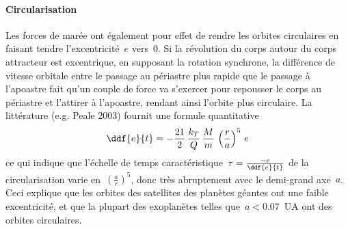 \sk
\paragraph{Circularisation} Les forces de marée ont également pour effet de rendre les orbites circulaires en faisant tendre l'excentricité~$e$ vers~$0$. Si la révolution du corps autour du corps attracteur est excentrique, en supposant la rotation synchrone, la différence de vitesse orbitale entre le passage au périastre plus rapide que le passage à l'apoastre fait qu'un couple de force va s'exercer pour repousser le corps au périastre et l'attirer à l'apoastre, rendant ainsi l'orbite plus circulaire. La littérature (e.g. Peale 2003) fournit une formule quantitative
\[ \ddf{e}{t} = - \frac{21}{2} \, \frac{k_T}{Q} \, \frac{M}{m} \, \left( \frac{r}{a} \right)^5 \, e  \]
\noindent ce qui indique que l'échelle de temps caractéristique~$\tau = \frac{-e}{\ddf{e}{t}} $ de la circularisation varie en~$\left( \frac{a}{r} \right)^5$, donc très abruptement avec le demi-grand axe~$a$. Ceci explique que les orbites des satellites des planètes géantes ont une faible excentricité, et que la plupart des exoplanètes telles que~$a < 0.07$~UA ont des orbites circulaires.

